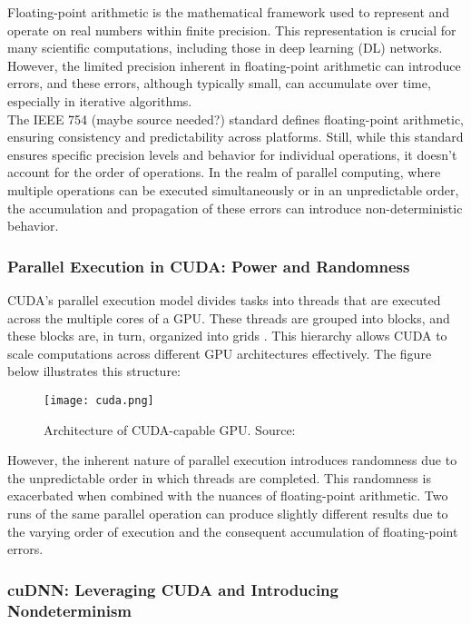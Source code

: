Floating-point arithmetic is the mathematical framework used to represent and operate on real numbers within finite precision. This representation is crucial for many scientific computations, including those in deep learning (DL) networks. However, the limited precision inherent in floating-point arithmetic can introduce errors, and these errors, although typically small, can accumulate over time, especially in iterative algorithms.\\

The IEEE 754 (maybe source needed?) standard defines floating-point arithmetic, ensuring consistency and predictability across platforms. Still, while this standard ensures specific precision levels and behavior for individual operations, it doesn't account for the order of operations. In the realm of parallel computing, where multiple operations can be executed simultaneously or in an unpredictable order, the accumulation and propagation of these errors can introduce non-deterministic behavior.\\

\subsubsection*{Parallel Execution in CUDA: Power and Randomness}

CUDA's parallel execution model divides tasks into threads that are executed across the multiple cores of a GPU. These threads are grouped into blocks, and these blocks are, in turn, organized into grids \cite{chetlur2014cudnn}. This hierarchy allows CUDA to scale computations across different GPU architectures effectively. The figure below illustrates this structure:\\

\begin{figure}[htbp]
\centerline{\texttt{[image: cuda.png]}}
\caption{Architecture of CUDA-capable GPU. Source:~\cite{chetlur2014cudnn} }
\label{fig:cuda}
\end{figure}

However, the inherent nature of parallel execution introduces randomness due to the unpredictable order in which threads are completed. This randomness is exacerbated when combined with the nuances of floating-point arithmetic. Two runs of the same parallel operation can produce slightly different results due to the varying order of execution and the consequent accumulation of floating-point errors.

\subsubsection*{cuDNN: Leveraging CUDA and Introducing Nondeterminism}

